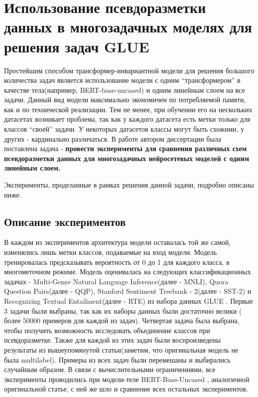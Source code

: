 \chapter{Использование псевдоразметки данных в многозадачных моделях для решения задач GLUE}\label{ch:pseudolabel}

Простейшим способом трансформер-инвариантной модели для решения большого количества задач является использование модели с одним “трансформером” в качестве тела(например, BERT-base-uncased) и одним линейным слоем на все задачи. Данный вид модели максимально экономичен по потребляемой памяти, как и по технической реализации. Тем не менее, при обучении его на нескольких датасетах возникает проблема, так как у каждого датасета есть метки только для классов “своей” задачи. У некоторых датасетов классы могут быть схожими, у других - кардинально различаться. В работе \cite{pseudolabel} автором диссертации была поставлена задача - \textbf{провести эксперименты для сравнения различных схем псевдоразметки данных для многозадачных нейросетевых моделей с одним линейным слоем.}

Эксперименты, проделанные в рамках решения данной задачи, подробно описаны ниже.




\section{Описание экспериментов}\label{ch:pseudolabel/sect1}
В каждом из экспериментов архитектура модели оставалась той же самой, изменялись лишь метки классов, подаваемые на вход модели. Модель тренировалась предсказывать вероятность от 0 до 1 для каждого класса, в многометочном режиме.
Модель оценивалась на следующих классификационных задачах - Multi-Genre Natural Language Inference(далее - MNLI), Quora Question Pairs(далее - QQP), Stanford Sentiment Treebank - 2(далее - SST-2) и Recognizing Textual Entailment(далее - RTE) из набора данных GLUE \cite{wang_2018}. Первые 3 задачи были выбраны, так как их наборы данных были достаточно велики ( более 50000 примеров для каждой из задач). Четвертая задача была выбрана, чтобы получить возможность исследовать объединение классов при псевдоразметке. Также для каждой из этих задач были воспроизведены результаты из вышеупомянутой статьи(заметим, что оригинальная модель не была multilabel). Примеры из всех задач были перемешаны и выбирались случайным образом. В связи с вычислительными ограничениями, все эксперименты проводились при модели-теле BERT-Base-Uncased \cite{devlin_2018}, аналогичной оригинальной статье, с ней же шло и сравнение всех остальных экспериментов.

